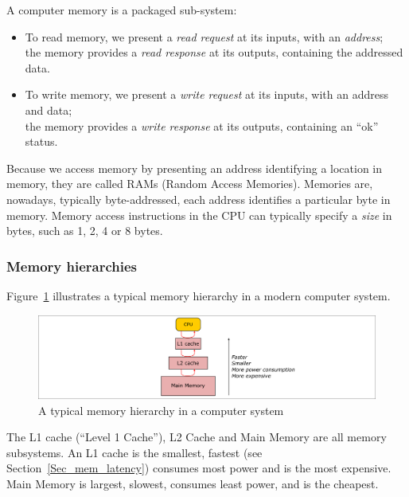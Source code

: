 \label{Sec_mem_split_phase}


A computer memory is a packaged sub-system:
\begin{itemize}

 \item To read memory, we present a \emph{read request} at its inputs,
       with an \emph{address}; \\
       the memory provides a \emph{read response} at its outputs,
       containing the addressed data.

 \item To write memory, we present a \emph{write request} at its
       inputs, with an address and data; \\
       the memory provides a \emph{write response} at its outputs,
       containing an ``ok'' status.

\end{itemize}


Because we access memory by presenting an address identifying a
location in memory, they are called RAMs (Random Access Memories).
Memories are, nowadays, typically byte-addressed, {\ie} each address
identifies a particular byte in memory.  Memory access instructions in
the CPU can typically specify a \emph{size} in bytes, such as 1, 2, 4
or 8 bytes.


\subsubsection{Memory hierarchies}


Figure~\ref{Fig_Mem_Hierarchy} illustrates a typical memory hierarchy
in a modern computer system.
\begin{figure}[htbp]
  \centerline{\includegraphics[width=6in,angle=0]{Figures/Fig_Mem_Hierarchy}}
  \caption{\label{Fig_Mem_Hierarchy}
           A typical memory hierarchy in a computer system}
\end{figure}
The L1 cache (``Level 1 Cache''), L2 Cache and Main Memory are all
memory subsystems.  An L1 cache is the smallest, fastest (see
Section~\ref{Sec_mem_latency}) consumes most power and is the most
expensive.  Main Memory is largest, slowest, consumes least power, and
is the cheapest.

